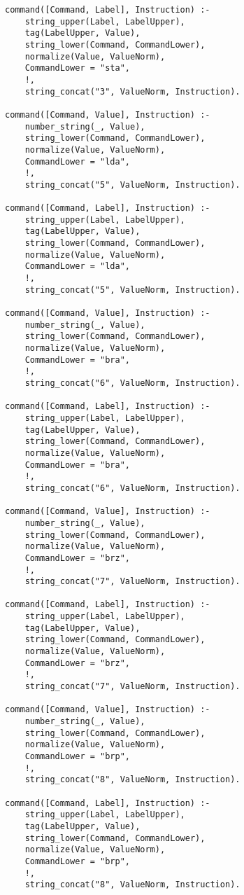\documentclass[a4paper,12pt, oneside]{book}
\begin{document}
\begin{verbatim}
command([Command, Label], Instruction) :- 
    string_upper(Label, LabelUpper),
    tag(LabelUpper, Value),
    string_lower(Command, CommandLower), 
    normalize(Value, ValueNorm),           
    CommandLower = "sta",
    !,
    string_concat("3", ValueNorm, Instruction).

command([Command, Value], Instruction) :- 
    number_string(_, Value),
    string_lower(Command, CommandLower), 
    normalize(Value, ValueNorm),           
    CommandLower = "lda",
    !,
    string_concat("5", ValueNorm, Instruction).

command([Command, Label], Instruction) :- 
    string_upper(Label, LabelUpper),
    tag(LabelUpper, Value),
    string_lower(Command, CommandLower), 
    normalize(Value, ValueNorm),           
    CommandLower = "lda",
    !,
    string_concat("5", ValueNorm, Instruction).

command([Command, Value], Instruction) :- 
    number_string(_, Value),
    string_lower(Command, CommandLower), 
    normalize(Value, ValueNorm),           
    CommandLower = "bra",
    !,
    string_concat("6", ValueNorm, Instruction).

command([Command, Label], Instruction) :- 
    string_upper(Label, LabelUpper),
    tag(LabelUpper, Value),
    string_lower(Command, CommandLower), 
    normalize(Value, ValueNorm),           
    CommandLower = "bra",
    !,
    string_concat("6", ValueNorm, Instruction).

command([Command, Value], Instruction) :- 
    number_string(_, Value),
    string_lower(Command, CommandLower), 
    normalize(Value, ValueNorm),           
    CommandLower = "brz",
    !,
    string_concat("7", ValueNorm, Instruction).

command([Command, Label], Instruction) :- 
    string_upper(Label, LabelUpper),
    tag(LabelUpper, Value),
    string_lower(Command, CommandLower), 
    normalize(Value, ValueNorm),           
    CommandLower = "brz",
    !,
    string_concat("7", ValueNorm, Instruction).

command([Command, Value], Instruction) :- 
    number_string(_, Value),
    string_lower(Command, CommandLower), 
    normalize(Value, ValueNorm),           
    CommandLower = "brp",
    !,
    string_concat("8", ValueNorm, Instruction).

command([Command, Label], Instruction) :- 
    string_upper(Label, LabelUpper),
    tag(LabelUpper, Value),
    string_lower(Command, CommandLower), 
    normalize(Value, ValueNorm),           
    CommandLower = "brp",
    !,
    string_concat("8", ValueNorm, Instruction).


\end{verbatim}
\end{document}
